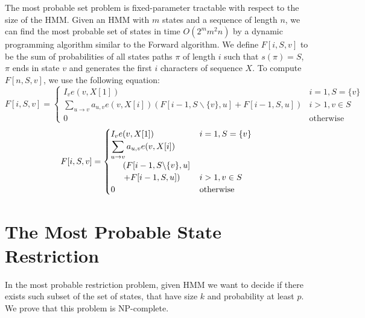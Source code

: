 The most probable set problem is
fixed-parameter tractable with respect to the size of the HMM. Given
an HMM with $m$ states and a sequence of length $n$, we can find the
most probable set of states in time $O(2^m m^2 n)$ by a dynamic
programming algorithm similar to the Forward algorithm.
We define $F[i,S,v]$ to be the sum of probabilities of all
states paths $\pi$ of length $i$ such that $s(\pi)=S$, $\pi$ ends in
state $v$ and generates the first $i$ characters of sequence $X$.
To compute $F[n,S,v]$, we use the following equation:
\ifx\settwocolumn\undefined
$$F[i,S,v] = \begin{cases}
I_{v}e(v,X[1])& i=1,S=\{v\}\\ 
\displaystyle \sum_{u\to v}a_{u,v}e(v,X[i])\left(F[i-1,S\backslash\{v\},u]
+ F[i-1,S,u]\right) & i>1, v\in S\\
0 & \mbox{otherwise}
\end{cases}$$
\else
$$F[i,S,v] = \begin{cases}
I_{v}e(v,X[1])& i=1,S=\{v\}\\ 
\displaystyle \sum_{u\to v}a_{u,v}e(v,X[i])\\\hspace{5mm}\left(F[i-1,S\backslash\{v\},u]\right.
\\\hspace{5mm}\left.
+ F[i-1,S,u]\right) & i>1, v\in S\\
0 & \mbox{otherwise}
\end{cases}$$
\fi
{}
\section{The Most Probable State Restriction}

\label{sec:restriction}

In the most probable restriction problem, given HMM we want to decide if there
exists such subset of the set of states, that have size $k$ and probability at
least $p$. We prove that this problem is NP-complete.


